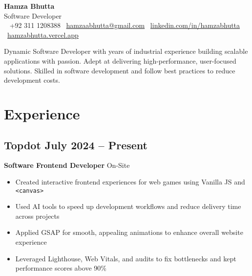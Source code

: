 \documentclass[11pt]{article}
\makeatletter
\newcommand{\resumeHeader}[5]{ %
    \begin{center}
        \vspace*{10pt}
        {\Huge\bfseries\color{headercolor} #1} \\[8pt]
        {\large\color{headercolor} Software Developer {}} \\[6pt]
        {\normalsize\color{headercolor}
            \faPhone~ {+92 311 1208388} {}
            \faEnvelope~\href{mailto:hamzaabhutta@gmail.com}{hamzaabhutta@gmail.com}  {}
            \faLinkedin~\href{https://www.linkedin.com/in/hamzabhutta}{linkedin.com/in/hamzabhutta} {}
            \faGlobe~\href{https://hamzabhutta.vercel.app/}{hamzabhutta.vercel.app}
        } \\[10pt]
        \parbox{0.9\textwidth}{\centering\small\color{black}#5} %
        \vspace{10pt}
    \end{center}
}
\makeatother
\begin{document}
\pagestyle{empty} %
\RaggedRight %

\resumeHeader{Hamza Bhutta}{}{}{}{Dynamic Software Developer with years of industrial experience building scalable applications with passion. Adept at delivering high-performance, user-focused solutions. Skilled in software development and follow best practices to reduce development costs.}



\section{Experience}
\subsection{\texorpdfstring{Topdot \hfill July 2024 -- Present}{Topdot, July 2024 -- Present}}  
\textbf{Software Frontend Developer} \hfill On-Site  
\begin{itemize}
\item Created interactive frontend experiences for web games using Vanilla JS and \texttt{<canvas>}
\item Used AI tools to speed up development workflows and reduce delivery time across projects  
\item Applied GSAP for smooth, appealing animations to enhance overall website experience  
\item Leveraged Lighthouse, Web Vitals, and audits to fix bottlenecks and kept performance scores above 90\%  
\end{itemize}
\end{document}

